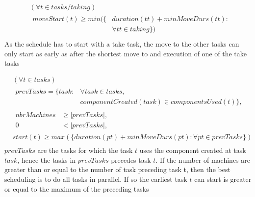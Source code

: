 \documentclass[10pt,a4paper]{report}
\begin{document}
\begin{equation}
\begin{aligned}\label{eq:69}
&(\forall t \in tasks / taking) \\
&\begin{aligned}
moveStart(t) \ge min(\{&duration(tt) + minMoveDurs(tt) :\\
&\forall tt \in taking\})\\
\end{aligned}
\end{aligned}
\end{equation}
As the schedule has to start with a take task, the move to the other tasks can only start as early as after the shortest move to and execution of one of the take tasks

\begin{equation}
\begin{aligned}\label{eq:70}
&(\forall t \in tasks)\\
&\begin{aligned}
prevTasks = \{task : &\forall task \in tasks,\\
&componentCreated(task) \in componentsUsed(t)\},
\end{aligned}\\
&\begin{aligned}
nbrMachines &\ge |prevTasks|,\\
0 &< |prevTasks|,
\end{aligned}\\
&start(t) \ge max(\{duration(pt) + minMoveDurs(pt) : \forall pt \in prevTasks\}) \\
\end{aligned}
\end{equation}
$prevTasks$ are the tasks for which the task $t$ uses the component created at task $task$, hence the tasks in $prevTasks$ precedes task $t$. If the number of machines are greater than or equal to the number of task preceding task t, then the best scheduling is to do all tasks in parallel. If so the earliest task $t$ can start is greater or equal to the maximum of the preceding tasks
\end{document}
